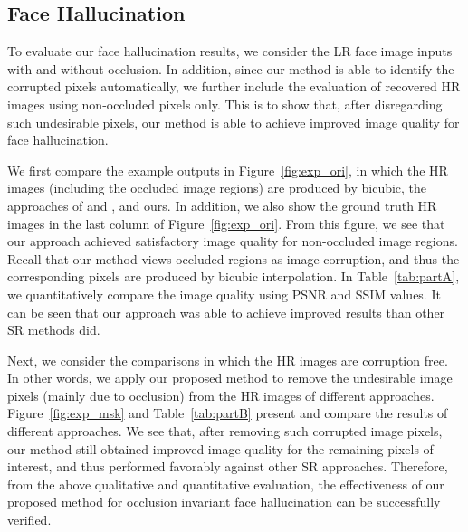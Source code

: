\subsection{Face Hallucination}

To evaluate our face hallucination results, we consider the LR face image inputs with and without occlusion. In addition, since our method is able to identify the corrupted pixels automatically, we further include the evaluation of recovered HR images using non-occluded pixels only. This is to show that, after disregarding such undesirable pixels, our method is able to achieve improved image quality for face hallucination.

We first compare the example outputs in Figure~\ref{fig:exp_ori}, in which the HR images (including the occluded image regions) are produced by bicubic, the approaches of \cite{convex} and \cite{Jiang_TMM2014}, and ours. In addition, we also show the ground truth HR images in the last column of Figure~\ref{fig:exp_ori}. From this figure, we see that our approach achieved satisfactory image quality for non-occluded image regions. Recall that our method views occluded regions as image corruption, and thus the corresponding pixels are produced by bicubic interpolation. In Table~\ref{tab:partA}, we quantitatively compare the image quality using PSNR and SSIM values. It can be seen that our approach was able to achieve improved results than other SR methods did.

Next, we consider the comparisons in which the HR images are corruption free. In other words, we apply our proposed method to remove the undesirable image pixels (mainly due to occlusion) from the HR images of different approaches. Figure~\ref{fig:exp_msk} and Table~\ref{tab:partB} present and compare the results of different approaches. We see that, after removing such corrupted image pixels, our method still obtained improved image quality for the remaining pixels of interest, and thus performed favorably against other SR approaches. Therefore, from the above qualitative and quantitative evaluation, the effectiveness of our proposed method for occlusion invariant face hallucination can be successfully verified.

